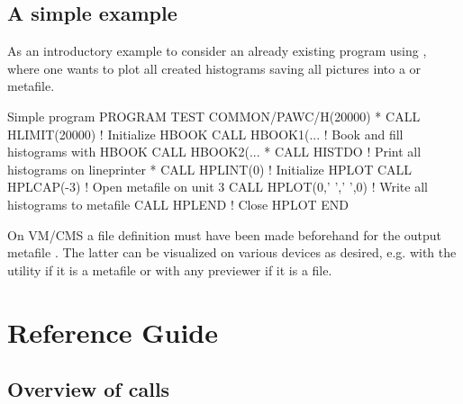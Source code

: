 \section{A simple example}
As an introductory example to \HPLOT{} consider an already existing program
using \HBOOK, where one wants to plot all created histograms saving all pictures
into a \GKS{} or \PS{} metafile.
\begin{XMPt}{Simple \HPLOT{} program}
       PROGRAM TEST
       COMMON/PAWC/H(20000)
*
       CALL HLIMIT(20000)         ! Initialize HBOOK
       CALL HBOOK1(...            ! Book and fill histograms with HBOOK
       CALL HBOOK2(...
*
       CALL HISTDO                ! Print all histograms on lineprinter
*
       CALL HPLINT(0)             ! Initialize HPLOT
       CALL HPLCAP(-3)            ! Open metafile on unit 3
       CALL HPLOT(0,' ',' ',0)    ! Write all histograms to metafile
       CALL HPLEND                ! Close HPLOT
       END
\end{XMPt}
On VM/CMS a file definition
must have been made beforehand for the output metafile .
The latter can be visualized on various devices as desired, e.g. with
the  utility if it is a \GKS{} metafile or with any \PS{}
previewer if it is a \PS{} file.


\chapter{Reference Guide}


\section{Overview of \protect\HPLOT{} calls}

